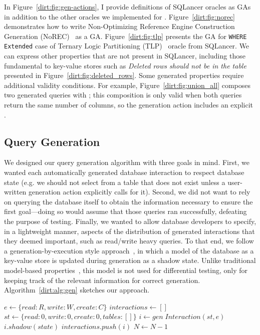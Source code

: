 In Figure~\ref{dirt:fig:gen-actions}, I provide definitions of SQLancer oracles as GAs
in addition to the other oracles we implemented for \tool{}.
Figure~\ref{dirt:fig:norec} demonstrates how to write Non-Optimizing Reference Engine
Construction Generation (NoREC)~\cite{rigger.norec} as a GA. Figure~\ref{dirt:fig:tlp}
presents the GA for \texttt{WHERE Extended} case of Ternary Logic Partitioning
(TLP)~\cite{rigger.tlp} oracle from SQLancer. We can express other properties that are
not present in SQLancer, including those fundamental to key-value stores such as
\emph{Deleted rows should not be in the table} presented in
Figure~\ref{dirt:fig:deleted_rows}.
%
Some generated properties require additional validity conditions. For example,
Figure~\ref{dirt:fig:union_all} composes two generated  queries with
; this composition is only valid when both queries return the same
number of columns, so the generation action includes an explicit .

\subsection{Query Generation}

We designed our query generation algorithm with three goals in mind. First, we wanted
each automatically generated database interaction to respect database state (e.g. we
should not select from a table that does not exist unless a user-written generation
action explicitly calls for it). Second, we did not want to rely on querying the
database itself to obtain the information necessary to ensure the first goal---doing so
would assume that those queries ran successfully, defeating the purpose of testing.
Finally, we wanted to allow database developers to specify, in a lightweight manner,
aspects of the distribution of generated interactions that they deemed important, such
as read/write heavy queries. To that end, we follow a generation-by-execution style
approach~\cite{testifc}, in which a model of the database as a key-value store is
updated during generation as a shadow state. Unlike traditional model-based
properties~\cite{htsi}, this model is not used for differential testing, only for
keeping track of the relevant information for correct generation.
Algorithm~\ref{dirt:alg:gen} sketches our approach.
\begin{algorithm}
  \caption{\tool{} Generation Algorithm}\label{dirt:alg:gen}
  \begin{algorithmic}
    \State $e \gets \{read: R, write: W, create: C\}$ 
    \State $interactions \gets []$
    \State $st \gets \{read: 0, write: 0, create: 0, tables: []\}$
    \State $i \gets gen \; Interaction (st, e)$
    \State $i.shadow(state)$ 
    \State $interactions.push(i)$
    \State $N \gets N - 1$
    \EndWhile
  \end{algorithmic}
\end{algorithm}

